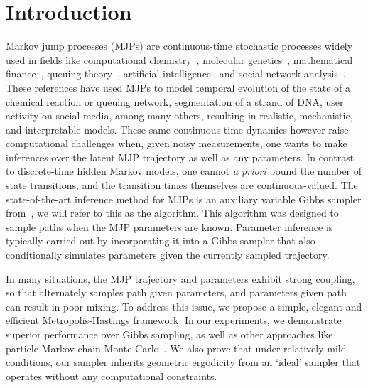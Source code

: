 
\section{Introduction}
\label{sec:intro}
Markov jump processes (MJPs) are continuous-time stochastic processes 
widely used in fields like computational chemistry~\cite{gillespie97}, 
molecular genetics~\cite{FearnSher2006}, mathematical finance~\cite{Elliott06}, 
queuing theory~\cite{Breuer2003}, artificial intelligence~\cite{XuShe10} and
social-network analysis~\cite{pan2016markov}. %
These references have used MJPs to model temporal evolution of the state 
of a chemical reaction or queuing network, segmentation of a strand of 
DNA, user activity on social media, among many others, resulting in 
realistic, mechanistic, and interpretable models. %
These same continuous-time dynamics however raise computational
challenges when, given noisy measurements, one wants to make inferences 
over the latent MJP trajectory as well as any parameters. 
In contrast to {discrete-time} hidden Markov models, one cannot 
{\em a priori} bound the number of state transitions, and the transition 
times themselves are continuous-valued. 
The state-of-the-art inference method for MJPs is an auxiliary variable 
Gibbs sampler from~\cite{RaoTeh13}, we will refer to this as the {\algname} 
algorithm. This  algorithm was designed to sample paths when the MJP parameters
are known. Parameter inference is typically carried out by 
incorporating it into a Gibbs sampler that also conditionally simulates
parameters given the currently sampled trajectory. 

In many situations, the MJP trajectory and parameters exhibit 
strong coupling, so that alternately samples path given
parameters, and parameters given path can result in poor mixing.  
To address this issue, we propose a simple, elegant and efficient 
Metropolis-Hastings framework. 
In our experiments, we demonstrate superior 
performance over Gibbs sampling, as well as other approaches like 
particle Markov chain Monte Carlo~\cite{Andrieu10}. We also prove 
that under relatively mild conditions, our sampler inherits geometric 
ergodicity from an `ideal' sampler that operates without any computational 
constraints.

